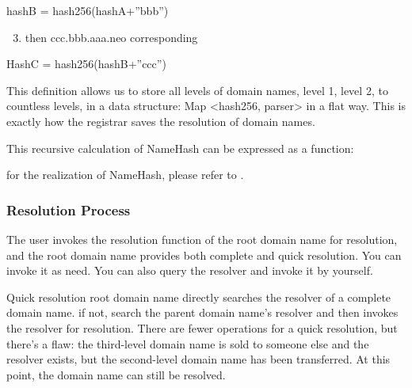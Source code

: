 \documentclass[letterpaper,10pt,english]{sphinxmanual}
\begin{document}
%
\begin{sphinxVerbatim}[commandchars=\\\{\}]
hashB  =  hash256(hashA+”bbb”)
\end{sphinxVerbatim}
\begin{enumerate}
\setcounter{enumi}{2}
\item {} 
then  ccc.bbb.aaa.neo corresponding

\end{enumerate}

%
\begin{sphinxVerbatim}[commandchars=\\\{\}]
HashC  =  hash256(hashB+”ccc”)
\end{sphinxVerbatim}

This definition allows us to store all levels of domain names, level 1, level 2, to countless levels, in a data structure: Map \textless{}hash256, parser\textgreater{} in a flat way.
This is exactly how the registrar saves the resolution of domain names.

This recursive calculation of NameHash can be expressed as a function:

%
\begin{sphinxVerbatim}[commandchars=\\\{\}]
   
\end{sphinxVerbatim}

for the realization of NameHash, please refer to {\hyperref[\detokenize{nns_protocol:namehash}]{}}.


\subsubsection{Resolution Process}
\label{\detokenize{nns_system:resolution-process}}
The user invokes the resolution function of the root domain name for resolution, and the root domain name provides both complete and quick resolution.
You can invoke it as need. You can also query the resolver and invoke it by yourself.


Quick resolution root domain name directly searches the resolver of a complete domain name. if not, search the parent domain name’s resolver and then invokes the resolver for resolution.
There are fewer operations for a quick resolution, but there’s a flaw: the third-level domain name is sold to someone else and the resolver exists, but the second-level domain name has been transferred. At this point, the domain name can still be resolved.
\end{document}
